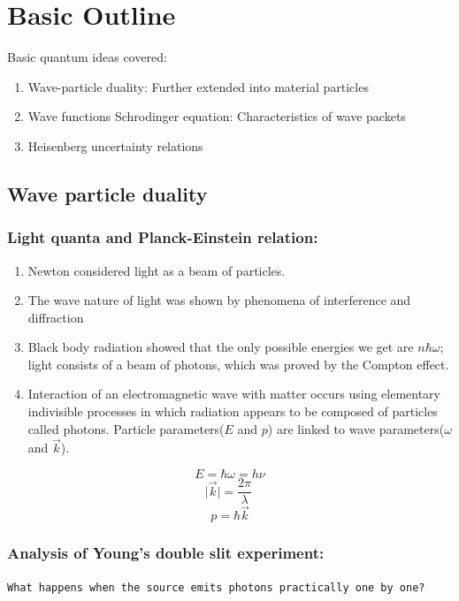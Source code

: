 \documentclass[%
 reprint,
 amsmath,amssymb,
 aps,
]{revtex4-2}
\begin{document}
\section{Basic Outline}
Basic quantum ideas covered:
\begin{enumerate}
\item Wave-particle duality: Further extended into material particles 
\item Wave functions Schrodinger equation: Characteristics of wave packets 
\item Heisenberg uncertainty relations 
\end{enumerate}
\subsection{Wave particle duality}
    \subsubsection{Light quanta and Planck-Einstein relation:}
        \begin{enumerate}
            \item Newton considered light as a beam of particles. 
            \item The wave nature of light was shown by phenomena of interference and diffraction  
            \item Black body radiation showed that the only possible energies we get are $n\hbar\omega$; light consists of a beam of photons, which was proved by the Compton effect. 
           \item Interaction of an electromagnetic wave with matter occurs using elementary indivisible processes in which radiation appears to be composed of particles called photons. Particle parameters($E$  and $p$) are linked to wave parameters($\omega$ and $\overrightarrow{k}$).
                   \end{enumerate}
    \begin{equation}
                E=\hbar\omega=h\nu
    \end{equation}
    \begin{equation}
        \mid \overrightarrow{k} \mid=\frac{2\pi}{\lambda} \
    \end{equation}
    \begin{equation}
        p=\hbar\overrightarrow{k}
    \end{equation}
    
\subsubsection{Analysis of Young's double slit experiment:}  
    \texttt{What happens when the source emits photons practically one by one?}\\
\end{document}
